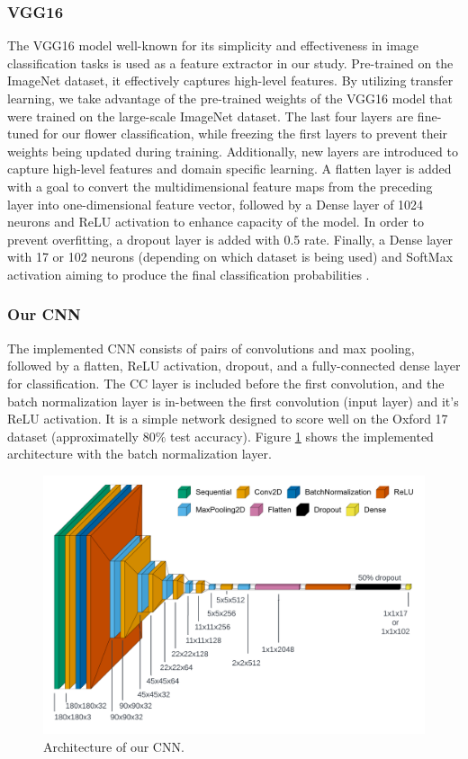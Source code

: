 \subsubsection{VGG16}

The VGG16 model well-known for its simplicity and effectiveness in image classification tasks \cite{SimonyanVGG} is used as a feature extractor in our study. Pre-trained on the ImageNet dataset, it effectively captures high-level features.
By utilizing transfer learning, we take advantage of the pre-trained weights of the VGG16 model that were trained on the large-scale ImageNet dataset.
The last four layers are fine-tuned for our flower classification, while freezing the first layers to prevent their weights being updated during training. Additionally, new layers are introduced to capture high-level features and domain specific learning.
A flatten layer is added with a goal to convert the multidimensional feature maps from the preceding layer into one-dimensional feature vector, followed by a Dense layer of 1024 neurons and ReLU activation to enhance capacity of the model. 
In order to prevent overfitting, a dropout layer is added with 0.5 rate. Finally, a Dense layer with 17 or 102 neurons (depending on which dataset is being used) and SoftMax activation aiming to produce the final classification probabilities \cite{kaggle_flower_cnn}.

\subsubsection{Our CNN}

The implemented \gls{CNN} consists of pairs of convolutions and max pooling, followed by a flatten, ReLU activation, dropout, and a fully-connected dense layer for classification.
The \gls{CC} layer is included before the first convolution, and the batch normalization layer is in-between the first convolution (input layer) and it's ReLU activation.
It is a simple network designed to score well on the Oxford 17 dataset (approximatelly $80\%$ test accuracy). Figure \ref{fig:our_cnn} shows the implemented architecture with the batch normalization layer.


\begin{figure}[ht]
    \centering
    \includegraphics[width=\textwidth]{images/ours_architecture.png}
    \caption{Architecture of our CNN.}
    \label{fig:our_cnn}
\end{figure}